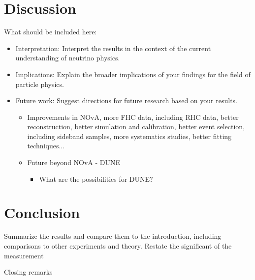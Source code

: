 \section{Discussion}\label{sec:NuMMDiscussion}

What should be included here:
\begin{itemize}
\item Interpretation: Interpret the results in the context of the current understanding of neutrino physics.
\item Implications: Explain the broader implications of your findings for the field of particle physics.
\item Future work: Suggest directions for future research based on your results.
\begin{itemize}
\item Improvements in NOvA, more FHC data, including RHC data, better reconstruction, better simulation and calibration, better event selection, including sideband samples, more systematics studies, better fitting techniques...
\item Future beyond NOvA - DUNE
\begin{itemize}
\item What are the possibilities for DUNE?
\end{itemize}
\end{itemize}
\end{itemize}



\section{Conclusion}\label{sec:NuMMConclusion}

Summarize the results and compare them to the introduction, including comparisons to other experiments and theory. Restate the significant of the measurement

Closing remarks
